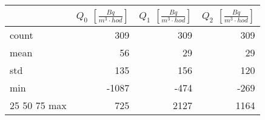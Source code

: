 \begin{tabular}{lrrr}
\toprule
{} &  $Q_0$ $\left[\si{\frac{Bq}{m^3\cdot hod}}\right]$ &  $Q_1$ $\left[\si{\frac{Bq}{m^3\cdot hod}}\right]$ &  $Q_2$ $\left[\si{\frac{Bq}{m^3\cdot hod}}\right]$ \\
\midrule
count &                                                309 &                                                309 &                                                309 \\
mean  &                                                 56 &                                                 29 &                                                 29 \\
std   &                                                135 &                                                156 &                                                120 \\
min   &                                              -1087 &                                               -474 &                                               -269 \\
25%
50%
75%
max   &                                                725 &                                               2127 &                                               1164 \\
\bottomrule
\end{tabular}
